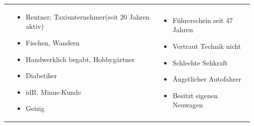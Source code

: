 \begin{center}
\begin{tabular}{| p{} | p{} | p{} |}
		&
		\begin{itemize}
			\item Rentner; Taxiunternehmer(seit 20 Jahren aktiv)
			\item Fischen, Wandern
			\item Handwerklich begabt, Hobbygärtner 
			\item Diabetiker
			\item idR. Minus-Kunde
			\item Geizig
		\end{itemize}	
		& 
		\begin{itemize}
			\item Führerschein seit 47 Jahren
			\item Vertraut Technik nicht
			\item Schlechte Sehkraft
			\item Ängstlicher Autofahrer
			\item Besitzt eigenen Neuwagen
		\end{itemize}
		\\ [0.5ex]
	

\end{tabular}
\end{center}
